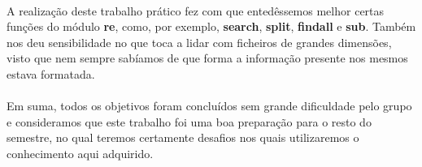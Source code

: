 \documentclass[11pt,a4paper]{report}
\begin{document}
\paragraph{}
A realização deste trabalho prático fez com que entedêssemos melhor certas funções do módulo \textbf{re}, como, por exemplo, \textbf{search}, \textbf{split}, \textbf{findall} e \textbf{sub}. Também nos deu sensibilidade no que toca a lidar com ficheiros de grandes dimensões, visto que nem sempre sabíamos de que forma a informação presente nos mesmos estava formatada. 
\paragraph{}
Em suma, todos os objetivos foram concluídos sem grande dificuldade pelo grupo e consideramos que este trabalho foi uma boa preparação para o resto do semestre, no qual teremos certamente desafios nos quais utilizaremos o conhecimento aqui adquirido. 
\end{document}
